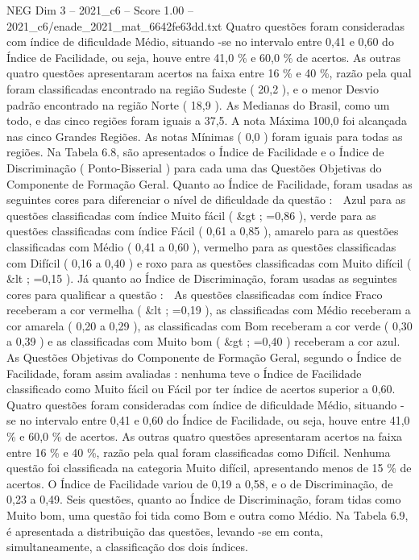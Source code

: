 \begin{textsample}{NEG Dim 3 – 2021\_c6 – Score 1.00 – 2021\_c6/enade\_2021\_mat\_6642fe63dd.txt}
Quatro questões foram consideradas com índice de dificuldade Médio, situando -se no intervalo entre 0,41 e 0,60 do Índice de Facilidade, ou seja, houve entre 41,0 \% e 60,0 \% de acertos.
As outras quatro questões apresentaram acertos na faixa entre 16 \% e 40 \%, razão pela qual foram classificadas encontrado na região Sudeste ( 20,2 ), e o menor Desvio padrão encontrado na região Norte ( 18,9 ).
As Medianas do Brasil, como um todo, e das cinco regiões foram iguais a 37,5.
A nota Máxima 100,0 foi alcançada nas cinco Grandes Regiões.
As notas Mínimas ( 0,0 ) foram iguais para todas as regiões.
Na Tabela 6.8, são apresentados o Índice de Facilidade e o Índice de Discriminação ( Ponto-Bisserial ) para cada uma das Questões Objetivas do Componente de Formação Geral.
Quanto ao Índice de Facilidade, foram usadas as seguintes cores para diferenciar o nível de dificuldade da questão :  Azul para as questões classificadas com índice Muito fácil ( \&gt ; =0,86 ), verde para as questões classificadas com índice Fácil ( 0,61 a 0,85 ), amarelo para as questões classificadas com Médio ( 0,41 a 0,60 ), vermelho para as questões classificadas com Difícil ( 0,16 a 0,40 ) e roxo para as questões classificadas com Muito difícil ( \&lt ; =0,15 ).
Já quanto ao Índice de Discriminação, foram usadas as seguintes cores para qualificar a questão :  As questões classificadas com índice Fraco receberam a cor vermelha ( \&lt ; =0,19 ), as classificadas com Médio receberam a cor amarela ( 0,20 a 0,29 ), as classificadas com Bom receberam a cor verde ( 0,30 a 0,39 ) e as classificadas com Muito bom ( \&gt ; =0,40 ) receberam a cor azul.
As Questões Objetivas do Componente de Formação Geral, segundo o Índice de Facilidade, foram assim avaliadas : nenhuma teve o Índice de Facilidade classificado como Muito fácil ou Fácil por ter índice de acertos superior a 0,60.
Quatro questões foram consideradas com índice de dificuldade Médio, situando -se no intervalo entre 0,41 e 0,60 do Índice de Facilidade, ou seja, houve entre 41,0 \% e 60,0 \% de acertos.
As outras quatro questões apresentaram acertos na faixa entre 16 \% e 40 \%, razão pela qual foram classificadas como Difícil.
Nenhuma questão foi classificada na categoria Muito difícil, apresentando menos de 15 \% de acertos.
O Índice de Facilidade variou de 0,19 a 0,58, e o de Discriminação, de 0,23 a 0,49.
Seis questões, quanto ao Índice de Discriminação, foram tidas como Muito bom, uma questão foi tida como Bom e outra como Médio.
Na Tabela 6.9, é apresentada a distribuição das questões, levando -se em conta, simultaneamente, a classificação dos dois índices.

\end{textsample}
